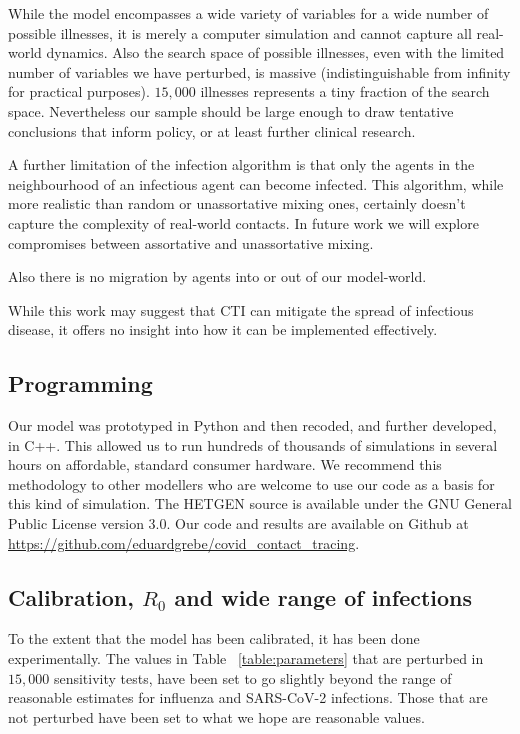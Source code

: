 \documentclass{article}
\begin{document}
While the model encompasses a wide variety of variables for a wide number of
possible illnesses, it is merely a computer simulation and cannot capture all
real-world dynamics. Also the search space of possible illnesses, even with the
limited number of variables we have perturbed, is massive (indistinguishable
from infinity for practical purposes). $15,000$ illnesses represents a tiny
fraction of the search space. Nevertheless our sample should be large enough to
draw tentative conclusions that inform policy, or at least further clinical
research.

A further limitation of the infection algorithm is that only the agents in the
neighbourhood of an infectious agent can become infected. This algorithm, while
more realistic than random or unassortative mixing ones, certainly doesn't
capture the complexity of real-world contacts. In future work we will explore
compromises between assortative and unassortative mixing.

Also there is no migration by agents into or out of our model-world.

While this work may suggest that CTI can mitigate the spread of infectious
disease, it offers no insight into how it can be implemented effectively.

\subsection{Programming}

Our model was prototyped in Python and then recoded, and further developed, in
C++. This allowed us to run hundreds of thousands of simulations in several
hours on affordable, standard consumer hardware. We recommend this methodology
to other modellers who are welcome to use our code as a basis for this kind of
simulation. The HETGEN source is available under the GNU General Public License
version 3.0. Our code and results are available on Github at
\url{https://github.com/eduardgrebe/covid_contact_tracing}.

\subsection{Calibration, $R_0$ and wide range of infections}

To the extent that the model has been calibrated, it has been done
experimentally. The values in Table ~\ref{table:parameters} that are perturbed
in $15,000$ sensitivity tests, have been set to go slightly beyond the range of
reasonable estimates for influenza and SARS-CoV-2 infections. Those that are not
perturbed have been set to what we hope are reasonable values.
\end{document}
